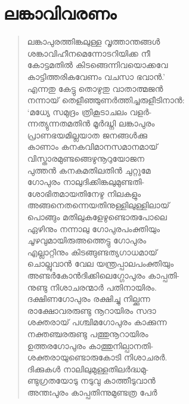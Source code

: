 
\section{ലങ്കാവിവരണം}

\begin{verse}
ലങ്കാപുരത്തിങ്കലുള്ള വൃത്താന്തങ്ങള്‍\\
ശങ്കാവിഹീനമെന്നോടറിയിക്ക നീ\\
കോട്ടമതില്‍ കിടങ്ങെന്നിവയൊക്കവേ\\
കാട്ടിത്തരികവേണം വചസാ ഭവാന്‍.’\\
എന്നതു കേട്ടു തൊഴുതു വാതാത്മജന്‍\\
നന്നായ് തെളീഞ്ഞുണര്‍ത്തിച്ചരുളീടിനാന്‍:\\
‘മധ്യേ സമുദ്രം ത്രികൂടാചലം വളര്‍-\\
ന്നത്യുന്നതമതിന്‍ മൂര്‍ദ്ധ്നി ലങ്കാപുരം\\
പ്രാണഭയമില്ലയാത  ജനങ്ങള്‍ക്കു\\
കാണാം കനകവിമാനസമാനമായ്\\
വിസ്താരമുണ്ടങ്ങെഴുനൂറുയോജന\\
പുത്തന്‍ കനകമതിലതിന്‍ ചുറ്റുമേ\\
ഗോപുരം നാലുദിക്കിങ്കലുമുണ്ടതി-\\
ശോഭിതമായതിനേഴു നിലകളും\\
അങ്ങനെതന്നെയതിനുള്ളിലുള്ളിലായ്\\
പൊങ്ങും മതിലുകളേഴുണ്ടൊരുപോലെ\\
ഏഴിനും നന്നാലു ഗോപുരപംക്തിയും\\
ചൂഴവുമായിരുഅത്തെട്ടു ഗോപുരം\\
എല്ലാറ്റിനും കിടങ്ങുണ്ടത്യഗാധമായ്\\
ചൊല്ലുവാന്‍ വേല യന്ത്രപ്പാലപംക്തിയും\\
അണ്ടര്‍കോന്‍ദിക്കിലെഗ്ഗോപുരം കാപ്പതി-\\
നുണ്ടു നിശാചരന്മാര്‍ പതിനായിരം.\\
ദക്ഷിണഗോപുരം രക്ഷിച്ചു നില്ക്കുന്ന\\
രാക്ഷോവരരുണ്ടു നൂറായിരം സദാ\\
ശക്തരായ് പശ്ചിമഗോപുരം കാക്കുന്ന\\
നക്തഞ്ചരരുണ്ടു പത്തുനൂറായിരം\\
ഉത്തരഗോപുരം കാത്തുനില്പാനതി-\\
ശക്തരായുണ്ടൊരുകോടി നിശാചരര്‍.\\
ദിക്കുകള്‍ നാലിലുമുള്ളതിലര്‍ദ്ധമു-\\
ണ്ടുഗ്രതയോടു നടുവു കാത്തീടുവാന്‍\\
അന്തഃപുരം കാപ്പതിന്നുമുണ്ടത്ര പേര്‍\\

\end{verse}
